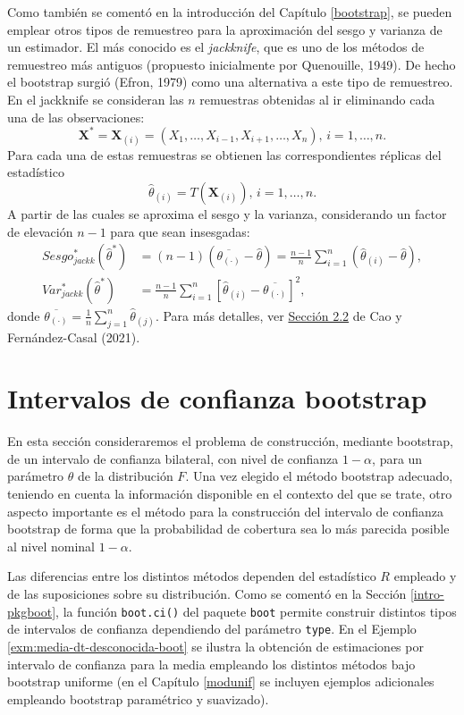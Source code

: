 \documentclass[
]{book}
\theoremstyle{break}
\theoremstyle{nonumberplain}
\begin{document}
Como también se comentó en la introducción del Capítulo \ref{bootstrap}, se pueden emplear otros tipos de remuestreo para la aproximación del sesgo y varianza de un estimador.
El más conocido es el \emph{jackknife}, que es uno de los métodos de remuestreo más antiguos (propuesto inicialmente por Quenouille, 1949).
De hecho el bootstrap surgió (Efron, 1979) como una alternativa a este tipo de remuestreo.
En el jackknife se consideran las \(n\) remuestras obtenidas al ir eliminando cada una de las observaciones:
\[\mathbf{X}^{\ast}= \mathbf{X}_{(i)}=\left( X_1,\ldots ,X_{i-1},X_{i+1},\ldots
,X_n \right) \text{,  } i=1,\ldots ,n.\]
Para cada una de estas remuestras se obtienen las correspondientes réplicas del estadístico
\[\hat \theta_{(i)} = T \left( \mathbf{X}_{(i)} \right) \text{,  } i=1,\ldots ,n.\]
A partir de las cuales se aproxima el sesgo y la varianza, considerando un factor de elevación \(n-1\) para que sean insesgadas:
\[\begin{aligned}
Sesgo_{jackk}^{\ast}\left( \hat{\theta}^{\ast} \right) 
&= \left( n-1 \right)\left( \overline{\theta_{(\cdot)}}-\hat{\theta} \right) 
= \frac{n-1}{n}\sum_{i=1}^{n}\left( \hat \theta_{(i)} - \hat{\theta} \right), \\
Var_{jackk}^{\ast}\left( \hat{\theta}^{\ast} \right) 
&= \frac{n-1}{n} \sum_{i=1}^{n}\left[ \hat \theta_{(i)} 
- \overline{\theta_{(\cdot)}}\right]^2,
\end{aligned}\]
donde \(\overline{\theta_{(\cdot)}} = \frac{1}{n}\sum_{j=1}^{n}\hat \theta_{(j)}\).
Para más detalles, ver \href{https://rubenfcasal.github.io/book_remuestreo/jackknife.html}{Sección 2.2} de Cao y Fernández-Casal (2021).

\hypertarget{boot-ic}{%
\section{Intervalos de confianza bootstrap}\label{boot-ic}}

En esta sección consideraremos el problema de construcción, mediante bootstrap, de un intervalo de confianza bilateral, con nivel de confianza \(1-\alpha\), para un parámetro \(\theta\) de la distribución \(F\).
Una vez elegido el método bootstrap adecuado, teniendo en cuenta la información disponible en el contexto del que se trate, otro aspecto importante es el método para la construcción del intervalo de confianza bootstrap de forma que la probabilidad de cobertura sea lo más parecida posible al nivel nominal \(1-\alpha\).

Las diferencias entre los distintos métodos dependen del estadístico \(R\) empleado y de las suposiciones sobre su distribución.
Como se comentó en la Sección \ref{intro-pkgboot}, la función \texttt{boot.ci()} del paquete \texttt{boot} permite construir distintos tipos de intervalos de confianza dependiendo del parámetro \texttt{type}.
En el Ejemplo \ref{exm:media-dt-desconocida-boot} se ilustra la obtención de estimaciones por intervalo de confianza para la media empleando los distintos métodos bajo bootstrap uniforme (en el Capítulo \ref{modunif} se incluyen ejemplos adicionales empleando bootstrap paramétrico y suavizado).
\end{document}
